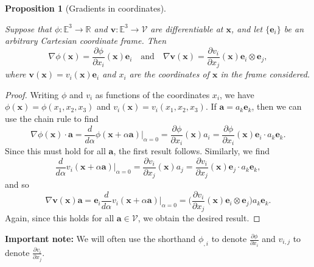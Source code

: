 \documentclass[
  letterpaper,
  DIV=11,
  numbers=noendperiod]{scrreprt}
\theoremstyle{plain}
\newtheorem{proposition}{Proposition}[chapter]
\theoremstyle{remark}
\begin{document}
\begin{proposition}[Gradients in
coordinates]\protect\hypertarget{prp-gradientincoords}{}\label{prp-gradientincoords}

Suppose that \(\phi:{\mathbb{E}}^3\to{\mathbb{R}}\) and
\({\boldsymbol{v}}:{\mathbb{E}}^3\to{\mathcal{V}}\) are differentiable
at \({\boldsymbol{x}}\), and let \(\{{\boldsymbol{e}}_i\}\) be an
arbitrary Cartesian coordinate frame. Then
\[\nabla\phi({\boldsymbol{x}}) = \frac{\partial\phi}{\partial x_i}({\boldsymbol{x}}){\boldsymbol{e}}_i\quad\text{and}\quad
    \nabla{\boldsymbol{v}}({\boldsymbol{x}}) = \frac{\partial v_i}{\partial x_j}({\boldsymbol{x}}){\boldsymbol{e}}_i\otimes{\boldsymbol{e}}_j,\]
where
\({\boldsymbol{v}}({\boldsymbol{x}}) = v_i({\boldsymbol{x}}){\boldsymbol{e}}_i\)
and \(x_i\) are the coordinates of \({\boldsymbol{x}}\) in the frame
considered.

\end{proposition}

\begin{proof}
Writing \(\phi\) and \(v_i\) as functions of the coordinates \(x_i\), we
have \(\phi({\boldsymbol{x}}) = \phi(x_1,x_2,x_3)\) and
\(v_i({\boldsymbol{x}}) = v_i(x_1,x_2,x_3)\). If
\({\boldsymbol{a}}= a_k{\boldsymbol{e}}_k\), then we can use the chain
rule to find
\[\nabla\phi({\boldsymbol{x}})\cdot{\boldsymbol{a}}= \frac{d}{d\alpha}\phi({\boldsymbol{x}}+\alpha {\boldsymbol{a}})\bigg|_{\alpha=0}= \frac{\partial \phi}{\partial x_i}({\boldsymbol{x}})a_i = \frac{\partial \phi}{\partial x_i}({\boldsymbol{x}}){\boldsymbol{e}}_i\cdot a_k{\boldsymbol{e}}_k.\]
Since this must hold for all \({\boldsymbol{a}}\), the first result
follows. Similarly, we find
\[\frac{d}{d\alpha}v_i({\boldsymbol{x}}+\alpha {\boldsymbol{a}})\bigg|_{\alpha=0}= \frac{\partial v_i}{\partial x_j}({\boldsymbol{x}})a_j = \frac{\partial v_i}{\partial x_j}({\boldsymbol{x}}){\boldsymbol{e}}_j\cdot a_k{\boldsymbol{e}}_k,\]
and so
\[\nabla{\boldsymbol{v}}({\boldsymbol{x}}){\boldsymbol{a}}= {\boldsymbol{e}}_i\frac{d}{d\alpha}v_i({\boldsymbol{x}}+\alpha{\boldsymbol{a}})\bigg|_{\alpha=0}
    =\bigg(\frac{\partial v_i}{\partial x_j}({\boldsymbol{x}}){\boldsymbol{e}}_i\otimes{\boldsymbol{e}}_j\bigg)a_k{\boldsymbol{e}}_k.\]
Again, since this holds for all \({\boldsymbol{a}}\in{\mathcal{V}}\), we
obtain the desired result.
\end{proof}

\textbf{Important note:} We will often use the shorthand \(\phi_{,i}\)
to denote \(\frac{\partial \phi}{\partial x_i}\) and \(v_{i,j}\) to
denote \(\frac{\partial v_i}{\partial x_j}\).
\end{document}
